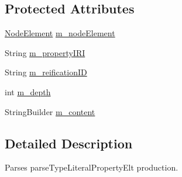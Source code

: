 \subsection*{Protected Attributes}
\begin{DoxyCompactItemize}
\item 
\hyperlink{classorg_1_1semanticweb_1_1owlapi_1_1rdf_1_1syntax_1_1_r_d_f_parser_1_1_node_element}{Node\-Element} \hyperlink{classorg_1_1semanticweb_1_1owlapi_1_1rdf_1_1syntax_1_1_r_d_f_parser_1_1_parse_type_literal_property_element_ac456f3c9f4917331438e29979ebf205f}{m\-\_\-node\-Element}
\item 
String \hyperlink{classorg_1_1semanticweb_1_1owlapi_1_1rdf_1_1syntax_1_1_r_d_f_parser_1_1_parse_type_literal_property_element_af95bdefb36770001e6d3c2e6e6541fc1}{m\-\_\-property\-I\-R\-I}
\item 
String \hyperlink{classorg_1_1semanticweb_1_1owlapi_1_1rdf_1_1syntax_1_1_r_d_f_parser_1_1_parse_type_literal_property_element_aefdda18ebf2ad88965f836b14b8d548f}{m\-\_\-reification\-I\-D}
\item 
int \hyperlink{classorg_1_1semanticweb_1_1owlapi_1_1rdf_1_1syntax_1_1_r_d_f_parser_1_1_parse_type_literal_property_element_a528705c5c9d6d4ca9e23c00fa0c7c1a9}{m\-\_\-depth}
\item 
String\-Builder \hyperlink{classorg_1_1semanticweb_1_1owlapi_1_1rdf_1_1syntax_1_1_r_d_f_parser_1_1_parse_type_literal_property_element_a08cac5835e8c7184063ba6dab87f5cc7}{m\-\_\-content}
\end{DoxyCompactItemize}


\subsection{Detailed Description}
Parses parse\-Type\-Literal\-Property\-Elt production. 

